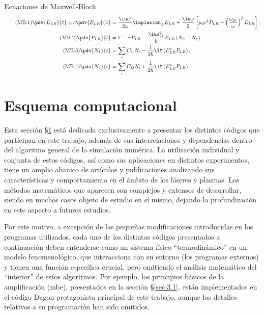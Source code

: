 \begin{footheorem*}{Ecuaciones de Maxwell-Bloch}
  \begin{align}
    \tag{MB.1}
    \pdv{E_{LR}}{t} \pm c \pdv{E_{LR}}{z} &= \frac{\iu c^{2}}{2 \omega}\laplacian_{\perp}E_{LR} + \frac{\iu \omega}{2} \left[\mu_{0}c^{2}P_{LR} - \left(\frac{\omega_{pe}}{\omega}\right)^{2}E_{LR}\right], \\
    \tag{MB.2}
    \pdv{P_{LR}}{t} &= \Gamma - \gamma P_{LR} - \frac{\iu d^{2}_{21}}{\hslash }E_{LR}\left(N_{2}-N_{1}\right), \\
    \tag{MB.3}
    \pdv{N_{1}}{t} &= \sum_{i} C_{i1}N_{i} - \frac{1}{2 \hslash }\IM \left(E_{LR}^{*}P_{LR}\right), \\
    \tag{MB.4}
    \pdv{N_{2}}{t} &= \sum_{i} C_{i2}N_{i} + \frac{1}{2 \hslash }\IM \left(E_{LR}^{*}P_{LR}\right).
  \end{align}
\end{footheorem*}

\section{Esquema computacional}\label{sec:3.2}
Esta sección \S\ref{sec:3.2} está dedicada exclusivamente a presentar los distintos códigos que participan en este trabajo, además de sus interrelaciones y dependencias dentro del algoritmo general de la simulación numérica. La utilización individual y conjunta de estos códigos, así como sus aplicaciones en distintos experimentos, tiene un amplio abanico de artículos y publicaciones\autocite{Larroche2000,Almiev2007,Velarde2005,Oliva2009} analizando sus características y comportamiento en el ámbito de los láseres y plasmas. Los métodos matemáticos que aparecen son complejos y extensos de desarrollar, siendo en muchos casos objeto de estudio en sí mismo\autocite{Oliva2010a}, dejando la profundización en este aspecto a futuros estudios.

Por este motivo, a excepción de las pequeñas modificaciones introducidas en los programas utilizados, cada uno de los distintos códigos presentados a continuación deben entenderse como un sistema físico \enquote{termodinámico} en un modelo fenomenológico, que interacciona con su entorno (los programas externos) y tienen una función específica crucial, pero omitiendo el análisis matemático del \enquote{interior} de estos algoritmos. Por ejemplo, los principios básicos de la amplificación (\acrshort{mbe}), presentados en la sección \S\ref{sec:3.1}, están implementados en el código Dagon protagonista principal de este trabajo, aunque los detalles relativos a su programación han sido omitidos.

